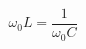 \documentclass[preview]{standalone}
\begin{document}
\begin{align*}
\omega_0 L = \dfrac{1}{\omega_0 C}\\
\end{align*}
\end{document}
